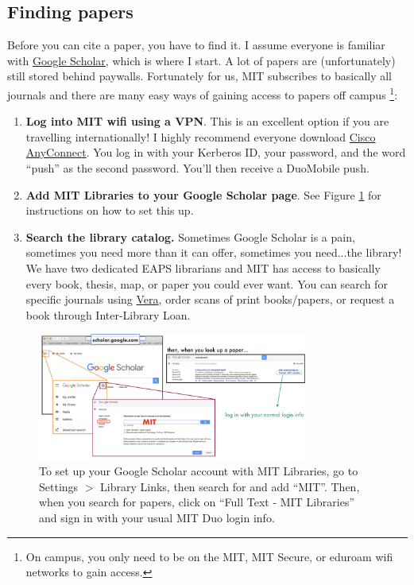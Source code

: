 \documentclass{article}
\begin{document}
\subsection*{Finding papers}
Before you can cite a paper, you have to find it. I assume everyone is familiar with \href{https://scholar.google.com}{Google Scholar}, which is where I start. A lot of papers are (unfortunately) still stored behind paywalls. Fortunately for us, MIT subscribes to basically all journals and there are many easy ways of gaining access to papers off campus \footnote{On campus, you only need to be on the MIT, MIT Secure, or eduroam wifi networks to gain access.}:
\begin{enumerate}
    \item \textbf{Log into MIT wifi using a VPN}. This is an excellent option if you are travelling internationally! I highly recommend everyone download \href{https://ist.mit.edu/cisco-anyconnect}{Cisco AnyConnect}. You log in with your Kerberos ID, your password, and the word ``push'' as the second password. You'll then receive a DuoMobile push. 
    \item \textbf{Add MIT Libraries to your Google Scholar page}. See Figure \ref{fig:gs} for instructions on how to set this up.
    \item \textbf{Search the library catalog.} Sometimes Google Scholar is a pain, sometimes you need more than it can offer, sometimes you need...the library! We have two dedicated EAPS librarians and MIT has access to basically every book, thesis, map, or paper you could ever want. You can search for specific journals using \href{}{Vera}, order scans of print books/papers, or request a book through Inter-Library Loan. 
\end{enumerate}

\begin{figure}[h!]
    \centering
    \includegraphics[width=0.8\textwidth]{gs.png}
    \caption{To set up your Google Scholar account with MIT Libraries, go to Settings $>$ Library Links, then search for and add ``MIT''. Then, when you search for papers, click on ``Full Text - MIT Libraries'' and sign in with your usual MIT Duo login info.}
    \label{fig:gs}
\end{figure}
\end{document}
